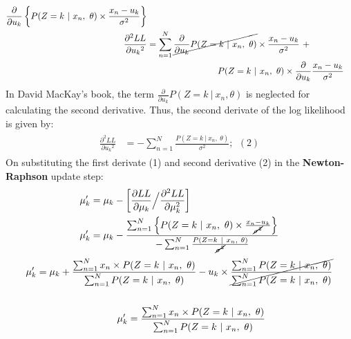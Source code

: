 \documentclass[solution,addpoints,12pt]{exam}
\begin{document}
\begin{questions}
\begin{parts}
\begin{solution}
\begin{eqnarray*}
\begin{aligned}
                    \frac{\partial}{\partial u_k} \left\{ P(Z = k~|~x_n,~\theta)\times\frac{x_n-u_k}{\sigma^2}
                \right\}
            \\
            \frac{\partial^2 LL}{\partial {u_k}^2} &= \sum_{n = 1}^{N}
                \cancel{\frac{\partial }{\partial u_k}P(Z = k~|~x_n,~\theta)}\times\frac{x_n-u_k}{\sigma^2} ~+\\ &~~~~~~~~~~~~~~~~~~~~~~~~P(Z = k~|~x_n,~\theta)\times \frac{\partial}{\partial u_k} \frac{x_n-u_k}{\sigma^2} 
        \end{aligned}
    \end{eqnarray*}
    In David MacKay's book, the term $\frac{\partial }{\partial u_k}P(Z = k~|~x_n,\theta)$ is neglected for calculating the second derivative. Thus, the second derivate of the log likelihood is given by:
    \begin{eqnarray*}
        \begin{aligned}
            \frac{\partial^2 LL}{\partial {u_k}^2} &= -\sum_{n = 1}^{N}
            \frac{P(Z = k~|~x_n,~\theta)}{\sigma^2};~~(2)
        \end{aligned}
    \end{eqnarray*}
    On substituting the first derivate (1) and second derivative (2) in the \textbf{Newton-Raphson} update step:\\
    \begin{eqnarray*}
        \begin{aligned}
            \mu_k' &= \mu_k - \left[ \frac{\partial LL}{\partial \mu_k}\Big/\frac{\partial^2 LL}{\partial \mu_k^2} \right]
            \\
            \mu_k' &= \mu_k - \frac{\sum_{n = 1}^{N}\left\{ 
                P(Z = k~|~x_n,~\theta)\times\frac{x_n-u_k}{\cancel{\sigma^2}}
            \right\}}{-\sum_{n = 1}^{N}
            \frac{P(Z = k~|~x_n,~\theta)}{\cancel{\sigma^2}}}\\
        \end{aligned}
    \end{eqnarray*}
    \begin{eqnarray*}
        \begin{aligned}
    \mu_k' &= \mu_k + \frac{\sum_{n = 1}^{N} x_n \times P(Z = k~|~x_n,~\theta)}{\sum_{n = 1}^{N} P(Z = k~|~x_n,~\theta)} - u_k \times \cancel{\frac{\sum_{n = 1}^{N} P(Z = k~|~x_n,~\theta)}{\sum_{n = 1}^{N} P(Z = k~|~x_n,~\theta)}}
    \\
    \\
    &~~~~~~~~~~~~~~~~~~~~~~~~~\mu_k' = \frac{\sum_{n = 1}^{N} x_n \times P(Z = k~|~x_n,~\theta)}{\sum_{n = 1}^{N} P(Z = k~|~x_n,~\theta)}
\end{aligned}
\end{eqnarray*}
\end{solution}


\end{parts}
\end{questions}
\end{document}
